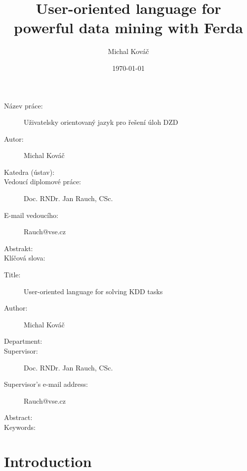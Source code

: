 \documentclass[a4paper,12pt]{book}
\author{Michal Kováč}
\title{User-oriented language for powerful data mining with Ferda}
\date{\today}
\begin{document}
\maketitle

\begin{description}
 \item [Název práce:] Uživatelsky orientovaný jazyk pro řešení úloh DZD
 \item [Autor:] Michal Kováč
 \item [Katedra (ústav):]
 \item [Vedoucí diplomové práce:] Doc. RNDr. Jan Rauch, CSc.
 \item [E-mail vedoucího:] Rauch@vse.cz
 \item [Abstrakt:]
 \item [Klíčová slova:]
\end{description}

\medskip

\begin{description}
 \item [Title:] User-oriented language for solving KDD tasks
 \item [Author:] Michal Kováč
 \item [Department:]
 \item [Supervisor:] Doc. RNDr. Jan Rauch, CSc.
 \item [Supervisor's e-mail address:] Rauch@vse.cz
 \item [Abstract:]
 \item [Keywords:]
\end{description}
\newpage
\tableofcontents

\chapter{Introduction}
\end{document}

